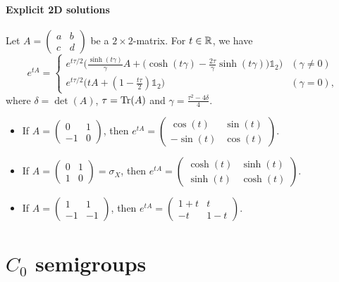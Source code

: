 \subsubsection{Explicit 2D solutions}
\begin{proposition}
Let $A = \begin{pmatrix}
a & b \\ c & d
\end{pmatrix}$ be a $2\times 2$-matrix. For $t\in \mathbb{R}$, we have
\[ e^{tA} = \begin{cases}
e^{t\tau/2}\Big(\frac{\sinh(t\gamma)}{\gamma}A + \big(\cosh(t\gamma) - \frac{2\tau}{\gamma}\sinh(t\gamma)\big)\mathbb{1}_2\Big) & (\gamma \neq 0) \\
e^{t\tau/2}\big(tA + (1-\frac{t\tau}{2})\mathbb{1}_2\big) & (\gamma = 0),
\end{cases} \]
where $\delta = \det(A)$, $\tau = \operatorname{Tr}(A)$ and $\gamma = \frac{\tau^2 - 4\delta}{4}$.
\end{proposition}

\begin{example}
\begin{itemize}
\item If $A = \begin{pmatrix}
0 & 1 \\ -1 & 0
\end{pmatrix}$, then $e^{tA} = \begin{pmatrix}
\cos(t) & \sin(t) \\ -\sin(t) & \cos(t)
\end{pmatrix}$.
\item If $A = \begin{pmatrix}
0 & 1 \\ 1 & 0
\end{pmatrix} = \sigma_X$, then $e^{tA} = \begin{pmatrix}
\cosh(t) & \sinh(t) \\ \sinh(t) & \cosh(t)
\end{pmatrix}$.
\item If $A = \begin{pmatrix}
1 & 1 \\ -1 & -1
\end{pmatrix}$, then $e^{tA} = \begin{pmatrix}
1+t & t \\ -t & 1-t
\end{pmatrix}$.
\end{itemize}
\end{example}

\chapter{$C_0$ semigroups}

